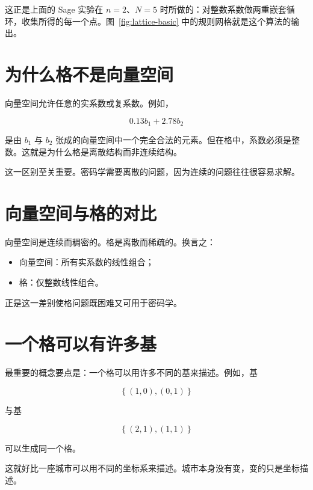 这正是上面的 Sage 实验在 $n=2$、$N=5$ 时所做的：对整数系数做两重嵌套循环，收集所得的每一个点。图~\ref{fig:lattice-basic} 中的规则网格就是这个算法的输出。

\section{为什么格不是向量空间}
向量空间允许任意的实系数或复系数。例如，

\[
0.13 b_1 + 2.78 b_2
\]

是由 $b_1$ 与 $b_2$ 张成的向量空间中一个完全合法的元素。但在格中，系数必须是整数。这就是为什么格是离散结构而非连续结构。

这一区别至关重要。密码学需要离散的问题，因为连续的问题往往很容易求解。

\section{向量空间与格的对比}
向量空间是连续而稠密的。格是离散而稀疏的。换言之：

\begin{itemize}
  \item 向量空间：所有实系数的线性组合；
  \item 格：仅整数线性组合。
\end{itemize}

正是这一差别使格问题既困难又可用于密码学。

\section{一个格可以有许多基}
最重要的概念要点是：一个格可以用许多不同的基来描述。例如，基

\[
\left\{(1,0), (0,1)\right\}
\]

与基

\[
\left\{(2,1), (1,1)\right\}
\]

可以生成同一个格。

这就好比一座城市可以用不同的坐标系来描述。城市本身没有变，变的只是坐标描述。

